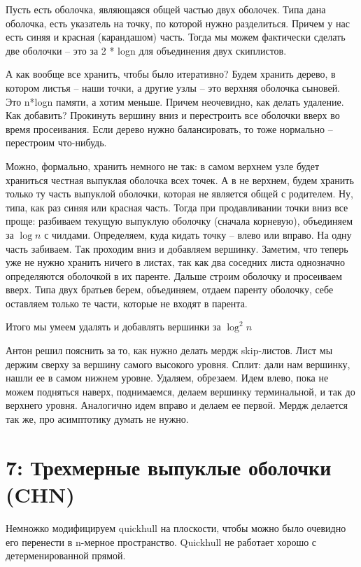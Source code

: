 \documentclass[11pt]{article}
\begin{document}
Пусть есть оболочка, являющаяся общей частью двух оболочек. Типа
дана оболочка, есть указатель на точку, по которой нужно
разделиться. Причем у нас есть синяя и красная (карандашом) часть.
Тогда мы можем фактически сделать две оболочки -- это за 2 * logn
для объединения двух скиплистов.

А как вообще все хранить, чтобы было итеративно? Будем хранить
дерево, в котором листья -- наши точки, а другие узлы -- это верхняя
оболочка сыновей. Это n*logn памяти, а хотим меньше. Причем
неочевидно, как делать удаление. Как добавить? Прокинуть вершину
вниз и перестроить все оболочки вверх во время просеивания. Если
дерево нужно балансировать, то тоже нормально -- перестроим
что-нибудь.

Можно, формально, хранить немного не так: в самом верхнем узле будет
храниться честная выпуклая оболочка всех точек. А в не верхнем,
будем хранить только ту часть выпуклой оболочки, которая не является
общей с родителем. Ну, типа, как раз синяя или красная часть. Тогда
при продавливании точки вниз все проще: разбиваем текущую выпуклую
оболочку (сначала корневую), объединяем за \(\log{n}\) с
чилдами. Определяем, куда кидать точку -- влево или вправо. На одну
часть забиваем. Так проходим вниз и добавляем вершинку. Заметим, что
теперь уже не нужно хранить ничего в листах, так как два соседних
листа однозначно определяются оболочкой в их паренте. Дальше строим
оболочку и просеиваем вверх. Типа двух братьев берем, объединяем,
отдаем паренту оболочку, себе оставляем только те части, которые не
входят в парента.

Итого мы умеем удалять и добавлять вершинки за \(\log^2{n}\)


Антон решил пояснить за то, как нужно делать мердж skip-листов. Лист
мы держим сверху за вершину самого высокого уровня. Сплит: дали нам
вершинку, нашли ее в самом нижнем уровне. Удаляем, обрезаем. Идем
влево, пока не можем подняться наверх, поднимаемся, делаем вершинку
терминальной, и так до верхнего уровня. Аналогично идем вправо и
делаем ее первой. Мердж делается так же, про асимптотику думать не
нужно.
\section{{\bfseries{}} 7:  Трехмерные выпуклые оболочки (CHN)}
\label{sec:orgheadline31}
Немножко модифицируем quickhull на плоскости, чтобы можно было
очевидно его перенести в n-мерное пространство. Quickhull не
работает хорошо с детерменированной прямой.
\end{document}
